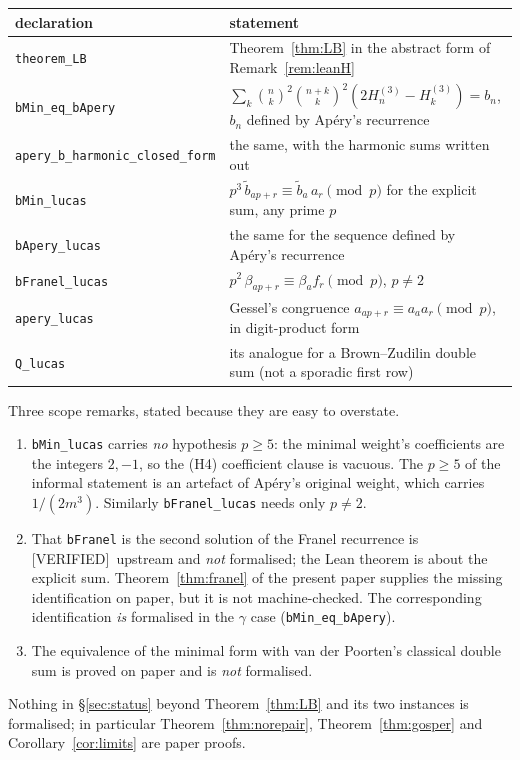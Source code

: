 \documentclass[11pt,reqno]{amsart}
\theoremstyle{plain}
\theoremstyle{definition}
\theoremstyle{remark}
\newcommand{\bin}[2]{\binom{#1}{#2}}
\newcommand{\HH}[2]{H^{(#1)}_{#2}}
\newcommand{\Verified}{\textup{\textsf{[VERIFIED]}}}
\numberwithin{equation}{section}
\begin{document}
\begin{center}\footnotesize
\begin{tabular}{@{}ll@{}}
\toprule
declaration & statement\\
\midrule
\texttt{theorem\_LB} & Theorem~\ref{thm:LB} in the abstract form of Remark~\ref{rem:leanH}\\
\texttt{bMin\_eq\_bApery} & $\sum_k\bin nk^2\bin{n+k}k^2(2\HH3n-\HH3k)=b_n$, $b_n$ defined by Ap\'ery's recurrence\\
\texttt{apery\_b\_harmonic\_closed\_form} & the same, with the harmonic sums written out\\
\texttt{bMin\_lucas} & $p^3\,\tilde b_{ap+r}\equiv\tilde b_a\,a_r\pmod p$ for the explicit sum, any prime $p$\\
\texttt{bApery\_lucas} & the same for the sequence defined by Ap\'ery's recurrence\\
\texttt{bFranel\_lucas} & $p^2\,\beta_{ap+r}\equiv\beta_a f_r\pmod p$, $p\ne2$\\
\texttt{apery\_lucas} & Gessel's congruence $a_{ap+r}\equiv a_aa_r\pmod p$, in digit-product form\\
\texttt{Q\_lucas} & its analogue for a Brown--Zudilin double sum (not a sporadic first row)\\
\bottomrule
\end{tabular}
\end{center}

Three scope remarks, stated because they are easy to overstate.
\begin{enumerate}[leftmargin=2em]
\item \texttt{bMin\_lucas} carries \emph{no} hypothesis $p\ge5$: the minimal weight's
  coefficients are the integers $2,-1$, so the (H4) coefficient clause is vacuous. The
  $p\ge5$ of the informal statement is an artefact of Ap\'ery's original weight, which
  carries $1/(2m^3)$. Similarly \texttt{bFranel\_lucas} needs only $p\ne2$.
\item That \texttt{bFranel} is the second solution of the Franel recurrence is
  \Verified\ upstream and \emph{not} formalised; the Lean theorem is about the explicit sum.
  Theorem~\ref{thm:franel} of the present paper supplies the missing identification on
  paper, but it is not machine-checked. The corresponding identification \emph{is}
  formalised in the $\gamma$ case (\texttt{bMin\_eq\_bApery}).
\item The equivalence of the minimal form with van der Poorten's classical double sum
  is proved on paper \cite[\S5]{MinimalFormMemo} and is \emph{not} formalised.
\end{enumerate}
Nothing in \S\ref{sec:status} beyond Theorem~\ref{thm:LB} and its two instances is
formalised; in particular Theorem~\ref{thm:norepair}, Theorem~\ref{thm:gosper} and
Corollary~\ref{cor:limits} are paper proofs.
\end{document}
